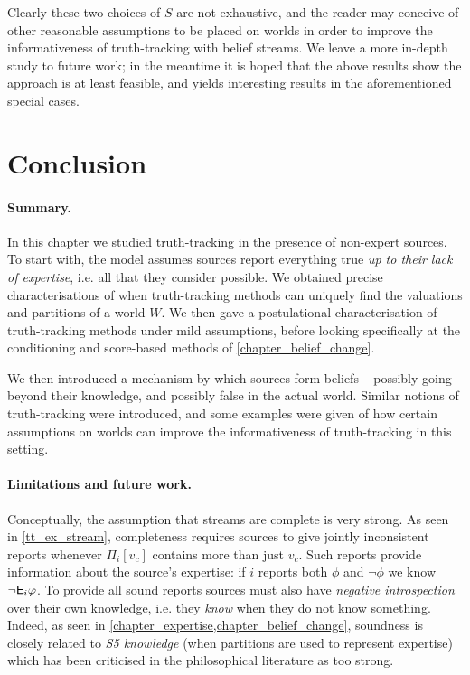 Clearly these two choices of $S$ are not exhaustive, and the reader may
conceive of other reasonable assumptions to be placed on worlds in order to
improve the informativeness of truth-tracking with belief streams. We leave a
more in-depth study to future work; in the meantime it is hoped that the above
results show the approach is at least feasible, and yields interesting results
in the aforementioned special cases.

\section{Conclusion}
\label{tt_sec_conclusion}

\paragraph{Summary.}

In this chapter we studied truth-tracking in the presence of non-expert
sources.  To start with, the model assumes sources report everything true
\emph{up to their lack of expertise}, i.e. all that they consider possible. We
obtained precise characterisations of when truth-tracking methods can uniquely
find the valuations and partitions of a world $W$. We then gave a postulational
characterisation of truth-tracking methods under mild assumptions, before
looking specifically at the conditioning and score-based methods of
\cref{chapter_belief_change}.

We then introduced a mechanism by which sources form beliefs -- possibly going
beyond their knowledge, and possibly false in the actual world. Similar notions
of truth-tracking were introduced, and some examples were given of how certain
assumptions on worlds can improve the informativeness of truth-tracking in this
setting.

\paragraph{Limitations and future work.}

Conceptually, the assumption that streams are complete is very strong. As seen
in \cref{tt_ex_stream}, completeness requires sources to give jointly
inconsistent reports whenever $\Pi_i[v_c]$ contains more than just $v_c$. Such
reports provide information about the source's expertise: if $i$ reports both
$\phi$ and $\neg\phi$ we know $\neg\mathsf{E}_i\varphi$. To provide all sound reports
sources must also have \emph{negative introspection} over their own knowledge,
i.e. they \emph{know} when they do not know something. Indeed, as seen in
\cref{chapter_expertise,chapter_belief_change}, soundness is closely related to
\emph{S5 knowledge} (when partitions are used to represent expertise) which has
been criticised in the philosophical literature as too strong.

